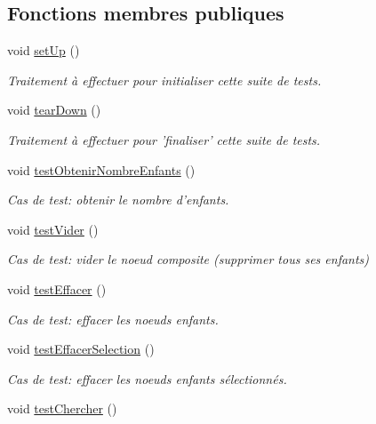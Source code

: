 \subsection*{Fonctions membres publiques}
\begin{DoxyCompactItemize}
\item 
void \hyperlink{group__inf2990_gac580ba74910c8d4e8476ce2f4e1930a2}{set\-Up} ()
\begin{DoxyCompactList}\small\item\em Traitement à effectuer pour initialiser cette suite de tests. \end{DoxyCompactList}\item 
void \hyperlink{group__inf2990_gaab8590913d1e0ce48d52ca2875c12c92}{tear\-Down} ()
\begin{DoxyCompactList}\small\item\em Traitement à effectuer pour 'finaliser' cette suite de tests. \end{DoxyCompactList}\item 
void \hyperlink{group__inf2990_gae6e5ecfa0bfef3aa50bbfe4b082821e9}{test\-Obtenir\-Nombre\-Enfants} ()
\begin{DoxyCompactList}\small\item\em Cas de test\-: obtenir le nombre d'enfants. \end{DoxyCompactList}\item 
void \hyperlink{group__inf2990_ga5e667d5f1bc2bf30fe013e5a630d95d5}{test\-Vider} ()
\begin{DoxyCompactList}\small\item\em Cas de test\-: vider le noeud composite (supprimer tous ses enfants) \end{DoxyCompactList}\item 
void \hyperlink{group__inf2990_ga2f7f5a6ba30a148469a30a8c32a8690c}{test\-Effacer} ()
\begin{DoxyCompactList}\small\item\em Cas de test\-: effacer les noeuds enfants. \end{DoxyCompactList}\item 
void \hyperlink{group__inf2990_ga9dc8155dc795120e1d6abfbbee81161b}{test\-Effacer\-Selection} ()
\begin{DoxyCompactList}\small\item\em Cas de test\-: effacer les noeuds enfants sélectionnés. \end{DoxyCompactList}\item 
void \hyperlink{group__inf2990_ga684b84f99cf5a559386a96b8c4468683}{test\-Chercher} ()

\end{DoxyCompactItemize}
